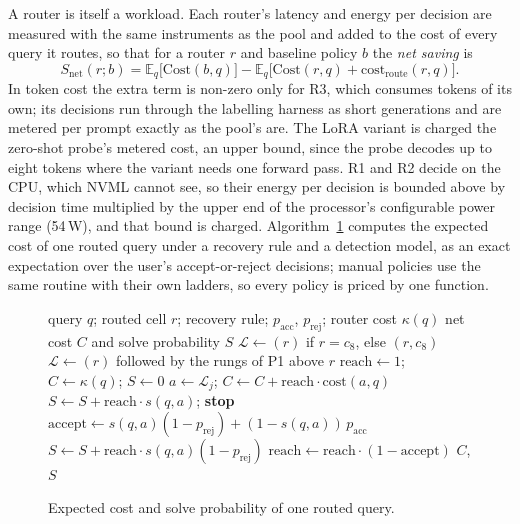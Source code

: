 \documentclass[final,5p,times,twocolumn]{elsarticle}
\makeatletter
\newcounter{algorithm}
\newenvironment{algorithm}[1][tbp]{\begin{figure}[#1]\def\@captype{algorithm}}%
  {\end{figure}}
\theoremstyle{plain}
\newcommand{\cost}{\mathrm{cost}}
\makeatother
\begin{document}
A router is itself a workload. Each router's latency and energy per decision
are measured with the same instruments as the pool and added to the cost of
every query it routes, so that for a router $r$ and baseline policy $b$ the
\emph{net saving} is
\begin{equation}
  S_{\mathrm{net}}(r; b) =
    \mathbb{E}_q\bigl[\mathrm{Cost}(b, q)\bigr]
  - \mathbb{E}_q\bigl[\mathrm{Cost}(r, q) + \cost_{\mathrm{route}}(r, q)\bigr].
  \label{eq:netsaving}
\end{equation}
In token cost the extra term is non-zero only for R3, which consumes tokens
of its own; its decisions run through the labelling harness as short
generations and are metered per prompt exactly as the pool's are. The LoRA
variant is charged the zero-shot probe's metered cost, an upper bound, since
the probe decodes up to eight tokens where the variant needs one forward
pass. R1 and R2 decide on the CPU, which NVML cannot see, so their energy per
decision is bounded above by decision time multiplied by the upper end of the
processor's configurable power range (54\,W), and that bound is charged.
Algorithm~\ref{alg:cost} computes the expected cost of one routed query under
a recovery rule and a detection model, as an exact expectation over the user's
accept-or-reject decisions; manual policies use the same routine with their
own ladders, so every policy is priced by one function.

\begin{algorithm}[t]
\caption{Expected cost and solve probability of one routed query.}
\label{alg:cost}
\small
\begin{algorithmic}[1]
\Require query $q$; routed cell $r$; recovery rule; $p_{\mathrm{acc}}$,
  $p_{\mathrm{rej}}$; router cost $\kappa(q)$
\Ensure net cost $C$ and solve probability $S$
  \State $\mathcal{L} \gets (r)$ if $r = c_8$, else $(r, c_8)$
\Else
  \State $\mathcal{L} \gets (r)$ followed by the rungs of P1 above $r$
\EndIf
\State $\mathrm{reach} \gets 1$; $C \gets \kappa(q)$; $S \gets 0$
  \State $a \gets \mathcal{L}_j$; $C \gets C + \mathrm{reach}\cdot
    \cost(a, q)$
    \State $S \gets S + \mathrm{reach}\cdot s(q, a)$; \textbf{stop}
  \EndIf
  \State $\mathrm{accept} \gets s(q, a)(1 - p_{\mathrm{rej}}) +
    (1 - s(q, a))\,p_{\mathrm{acc}}$
  \State $S \gets S + \mathrm{reach}\cdot s(q, a)(1 - p_{\mathrm{rej}})$
  \State $\mathrm{reach} \gets \mathrm{reach}\cdot(1 - \mathrm{accept})$
\EndFor
\State \Return $C$, $S$
\end{algorithmic}
\end{algorithm}
\end{document}
